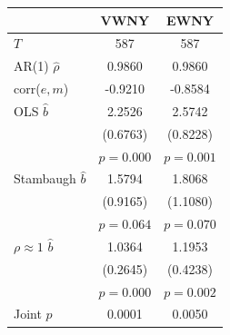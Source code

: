 \begin{tabular}{lcc}
\toprule
 & VWNY & EWNY \\
\midrule
$T$ & 587 & 587 \\
AR(1) $\hat\rho$ & 0.9860 & 0.9860 \\
corr($e,m$) & -0.9210 & -0.8584 \\
\midrule
OLS $\hat b$ & 2.2526 & 2.5742 \\
 & (0.6763) & (0.8228) \\
 & $p=0.000$ & $p=0.001$ \\
Stambaugh $\hat b$ & 1.5794 & 1.8068 \\
 & (0.9165) & (1.1080) \\
 & $p=0.064$ & $p=0.070$ \\
$\rho\approx1$ $\hat b$ & 1.0364 & 1.1953 \\
 & (0.2645) & (0.4238) \\
 & $p=0.000$ & $p=0.002$ \\
\midrule
Joint $p$ & 0.0001 & 0.0050 \\
\bottomrule
\end{tabular}
